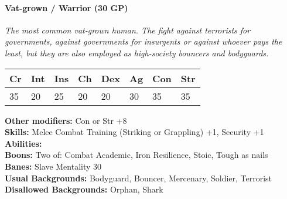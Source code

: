 \hrulefill
\paragraph*{Vat-grown / Warrior (30 GP)}
\textit{The most common vat-grown human. The fight against terrorists for governments, against governments for insurgents or against whoever pays the least, but they are also employed as high-society bouncers and bodyguards.}\par
\begin{tabular}{|l|l|l|l|l|l|l|l|}
	\hline
	Cr & Int & Ins & Ch & Dex & Ag & Con & Str \\ \hline
	35 & 20 & 25 & 20 & 20 & 30 & 35 & 35 \\ \hline
\end{tabular}\par
\noindent\textbf{Other modifiers:} Con or Str +8\\
\textbf{Skills:} Melee Combat Training (Striking or Grappling) +1,
Security +1\\
\textbf{Abilities:} \\
\textbf{Boons:} Two of: Combat Academic, Iron Resilience, Stoic, Tough as nails\\
\textbf{Banes:} Slave Mentality 30\\
\textbf{Usual Backgrounds:} Bodyguard, Bouncer, Mercenary, Soldier, Terrorist\\
\textbf{Disallowed Backgrounds:} Orphan, Shark
